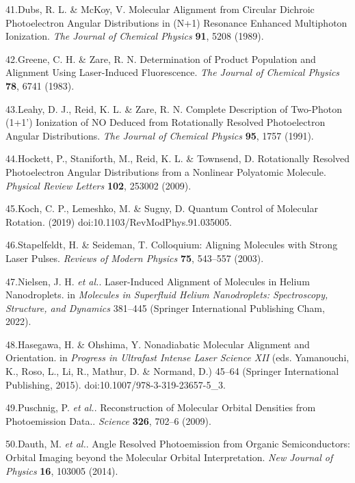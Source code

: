 \documentclass[10pt]{article}
\begin{document}
\label{csl:41}41.Dubs, R. L. \& McKoy, V. {Molecular Alignment from Circular Dichroic Photoelectron Angular Distributions in (N+1) Resonance Enhanced Multiphoton Ionization}. \textit{The Journal of Chemical Physics} \textbf{91}, 5208 (1989).

\label{csl:42}42.Greene, C. H. \& Zare, R. N. {Determination of Product Population and Alignment Using Laser-Induced Fluorescence}. \textit{The Journal of Chemical Physics} \textbf{78}, 6741 (1983).

\label{csl:43}43.Leahy, D. J., Reid, K. L. \& Zare, R. N. {Complete Description of Two-Photon (1+1') Ionization of {{NO}} Deduced from Rotationally Resolved Photoelectron Angular Distributions}. \textit{The Journal of Chemical Physics} \textbf{95}, 1757 (1991).

\label{csl:44}44.Hockett, P., Staniforth, M., Reid, K. L. \& Townsend, D. {Rotationally {{Resolved Photoelectron Angular Distributions}} from a {{Nonlinear Polyatomic Molecule}}}. \textit{Physical Review Letters} \textbf{102}, 253002 (2009).

\label{csl:45}45.Koch, C. P., Lemeshko, M. \& Sugny, D. {Quantum Control of Molecular Rotation}. (2019) doi:10.1103/RevModPhys.91.035005.

\label{csl:46}46.Stapelfeldt, H. \& Seideman, T. {Colloquium: {{Aligning}} Molecules with Strong Laser Pulses}. \textit{Reviews of Modern Physics} \textbf{75}, 543–557 (2003).

\label{csl:47}47.Nielsen, J. H. \textit{et al.}. {Laser-Induced Alignment of Molecules in Helium Nanodroplets}. in \textit{Molecules in Superfluid Helium Nanodroplets: Spectroscopy, Structure, and Dynamics} 381–445 (Springer International Publishing Cham, 2022).

\label{csl:48}48.Hasegawa, H. \& Ohshima, Y. {Nonadiabatic {{Molecular Alignment}} and {{Orientation}}}. in \textit{Progress in {{Ultrafast Intense Laser Science XII}}} (eds. Yamanouchi, K., Roso, L., Li, R., Mathur, D. \& Normand, D.) 45–64 ({Springer International Publishing}, 2015). doi:10.1007/978-3-319-23657-5_3.

\label{csl:49}49.Puschnig, P. \textit{et al.}. {Reconstruction of Molecular Orbital Densities from Photoemission Data.}. \textit{Science} \textbf{326}, 702–6 (2009).

\label{csl:50}50.Dauth, M. \textit{et al.}. {Angle Resolved Photoemission from Organic Semiconductors: Orbital Imaging beyond the Molecular Orbital Interpretation}. \textit{New Journal of Physics} \textbf{16}, 103005 (2014).
\end{document}

